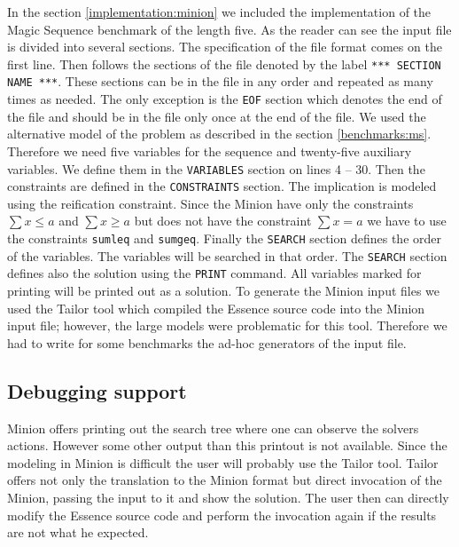 In the section \ref{implementation:minion} we included the implementation of the Magic
Sequence benchmark of the length five. As the reader can see the input file
is divided into several sections. The specification of the file format comes on the first line.
Then follows the sections of the file denoted by the label \texttt{*** SECTION NAME ***}. These
sections can be in the file in any order and repeated as many times as needed. The
only exception is the \texttt{EOF} section which denotes the end of the file and should be in
the file only once at the end of the file. We used the alternative model of the 
problem as described in the section \ref{benchmarks:ms}. Therefore we need five 
variables for the sequence and twenty-five auxiliary variables. We define them in 
the \texttt{VARIABLES} section on lines 4 -- 30. Then the constraints are defined in the 
\texttt{CONSTRAINTS} section. The implication is modeled using the reification constraint.
Since the Minion have only the constraints $\sum{x} \leq a$ and $\sum{x} \geq a$ but
 does not have the constraint $\sum{x} = a$ we have to use the constraints \texttt{sumleq} and
 \texttt{sumgeq}. Finally the \texttt{SEARCH} section defines the order of the variables.
 The variables will be searched in that order. The \texttt{SEARCH} section defines also the
 solution using the \texttt{PRINT} command. All variables marked for printing will
 be printed out as a solution. To generate the Minion input files we used the Tailor tool which
 compiled the Essence source code into the Minion input file; however, the large
 models were problematic for this tool. Therefore we had to write for some benchmarks
 the ad-hoc generators of the input file.
 
\subsection{Debugging support}
Minion offers printing out the search tree where one can observe the solvers actions.
However some other output than this printout is not available. Since the modeling in Minion
is difficult the user will probably use the Tailor tool. Tailor offers not only the translation
to the Minion format but direct invocation of the Minion, passing the input to it and
show the solution. The user then can directly modify the Essence source code and perform
the invocation again if the results are not what he expected. 


